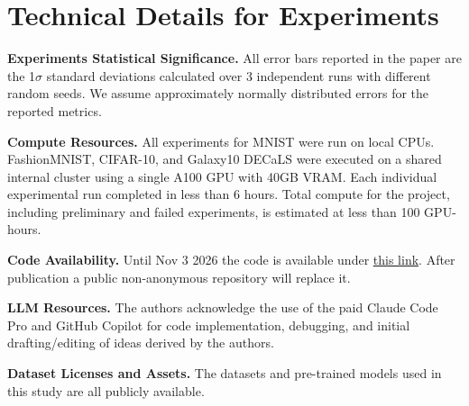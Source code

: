 \documentclass{article}
\theoremstyle{plain}
\theoremstyle{definition}
\theoremstyle{remark}
\newcommand{\Pp}{\mathbb{P}}
\newcommand{\E}{\mathbb{E}}
\newcommand{\R}{\mathbb{R}}
\newcommand{\X}{\mathcal{X}}
\newcommand{\D}{\mathcal{D}}
\DeclareMathOperator{\conv}{conv}
\DeclareMathOperator{\rank}{rank}
\DeclareMathOperator{\supp}{supp}
\DeclareMathOperator{\diag}{diag}
\DeclareMathOperator{\softmax}{softmax}
\DeclareMathOperator{\KL}{KL}
\newcounter{inlineassump}
\renewcommand{\theinlineassump}{A\arabic{inlineassump}}
\newcounter{inlinethm}
\renewcommand{\theinlinethm}{\arabic{inlinethm}}
\newcommand{\asmp}[1]{\ref{#1}} %
\newcommand{\setasmp}[2]{%
    \refstepcounter{inlineassump}%
    \label{#1}%
    \textbf{(\theinlineassump)} \emph{#2}%
}
\newcommand{\setthm}[2]{%
    \refstepcounter{inlinethm}%
    \label{#1}%
    \textbf{Theorem~\theinlinethm\ (#2).}%
}
\begin{document}




\appendix

\section{Technical Details for Experiments}

\textbf{Experiments Statistical Significance.} All error bars reported in the paper are the 1$\sigma$ standard deviations calculated over 3 independent runs with different random seeds. We assume approximately normally distributed errors for the reported metrics.

\textbf{Compute Resources.} All experiments for MNIST were run on local CPUs. FashionMNIST, CIFAR-10, and Galaxy10 DECaLS were executed on a shared internal cluster using a single A100 GPU with 40GB VRAM. Each individual experimental run completed in less than 6 hours. Total compute for the project, including preliminary and failed experiments, is estimated at less than 100 GPU-hours.

\textbf{Code Availability.} Until Nov 3 2026 the code is available under \href{https://anonymous.4open.science/r/MulticlassClassificationWithoutLabelsViaPosteriorSimplexGeometry-B2CA}{this link}. After publication a public non-anonymous repository will replace it.

\textbf{LLM Resources.} The authors acknowledge the use of the paid Claude Code Pro and GitHub Copilot for code implementation, debugging, and initial drafting/editing of ideas derived by the authors.

\textbf{Dataset Licenses and Assets.} The datasets and pre-trained models used in this study are all publicly available.

 
%
%
%
\end{document}
